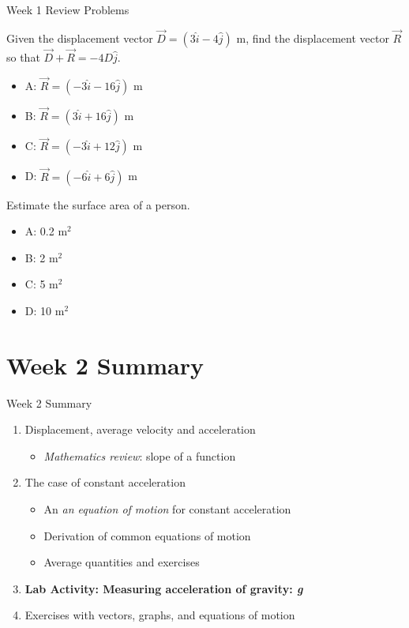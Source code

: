 \documentclass{beamer}
\begin{document}
\begin{frame}{Week 1 Review Problems}
\small
\begin{minipage}[b]{0.45\linewidth}
Given the displacement vector $\vec{D} = (3\hat{i}-4\hat{j})$ m, find the displacement vector $\vec{R}$ so that $\vec{D} + \vec{R} = -4D\hat{j}$.
\begin{itemize}
\item A: $\vec{R} =  (-3\hat{i}-16\hat{j})$ m
\item B: $\vec{R} =  (3\hat{i}+16\hat{j})$ m
\item C: $\vec{R} =  (-3\hat{i}+12\hat{j})$ m
\item D: $\vec{R} =  (-6\hat{i}+6\hat{j})$ m
\end{itemize}
\end{minipage}
\hspace{0.5cm}
\begin{minipage}[b]{0.45\linewidth}
Estimate the surface area of a person.
\vspace{1cm}
\begin{itemize}
\item A: 0.2 m$^2$
\item B: 2 m$^2$
\item C: 5 m$^2$
\item D: 10 m$^2$
\end{itemize}
\end{minipage}
\end{frame}

\section{Week 2 Summary}

\begin{frame}{Week 2 Summary}
\begin{enumerate}
\item Displacement, average velocity and acceleration
\begin{itemize}
\item \textit{Mathematics review}: slope of a function
\end{itemize}
\item The case of constant acceleration
\begin{itemize}
\item An \textit{an equation of motion} for constant acceleration
\item Derivation of \alert{common equations of motion}
\item Average quantities and exercises
\end{itemize}
\item \textbf{Lab Activity: Measuring acceleration of gravity: \textit{g}}
\item Exercises with vectors, graphs, and equations of motion
\end{enumerate}
\end{frame}
\end{document}
